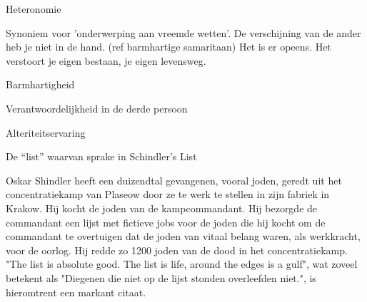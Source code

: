 \documentclass[main.tex]{subfiles}
\begin{document}
\begin{examenvraag}
    \begin{vraag}
        Heteronomie
    \end{vraag}

    \begin{antwoord}
        Synoniem voor 'onderwerping aan vreemde wetten'.
        De verschijning van de ander heb je niet in de hand. (ref barmhartige samaritaan)
        Het is er opeens. 
        Het verstoort je eigen bestaan, je eigen levensweg.
    \end{antwoord}
\end{examenvraag}


\begin{examenvraag}
    \begin{vraag}
        Barmhartigheid
    \end{vraag}

    \begin{antwoord}

    \end{antwoord}
\end{examenvraag}


\begin{examenvraag}
    \begin{vraag}
        Verantwoordelijkheid in de derde persoon
    \end{vraag}

    \begin{antwoord}

    \end{antwoord}
\end{examenvraag}


\begin{examenvraag}
    \begin{vraag}
        Alteriteitservaring
    \end{vraag}

    \begin{antwoord}

    \end{antwoord}
\end{examenvraag}


\begin{examenvraag}
    \begin{vraag}
        De “list” waarvan sprake in Schindler’s List
    \end{vraag}

    \begin{antwoord}
        Oskar Shindler heeft een duizendtal gevangenen, vooral joden, geredt uit het concentratiekamp van Plaseow door ze te werk te stellen in zijn fabriek in Krakow.
        Hij kocht de joden van de kampcommandant.
        Hij bezorgde de commandant een lijst met fictieve jobs voor de joden die hij kocht om de commandant te overtuigen dat de joden van vitaal belang waren, als werkkracht, voor de oorlog.
        Hij redde zo 1200 joden van de dood in het concentratiekamp.
        "The list is absolute good. The list is life, around the edges is a gulf", wat zoveel betekent als "Diegenen die niet op de lijst stonden overleefden niet.", is hieromtrent een markant citaat.
    \end{antwoord}
\end{examenvraag}
\end{document}
